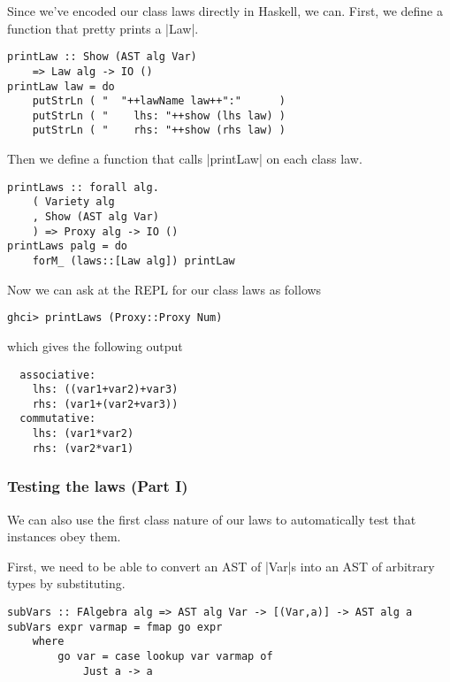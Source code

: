 \documentclass[preprint]{sigplanconf}
\theoremstyle{definition}
\begin{document}
Since we've encoded our class laws directly in Haskell, we can.
First, we define a function that pretty prints a |Law|.
\begin{lstlisting}
printLaw :: Show (AST alg Var)
    => Law alg -> IO ()
printLaw law = do
    putStrLn ( "  "++lawName law++":"      )
    putStrLn ( "    lhs: "++show (lhs law) )
    putStrLn ( "    rhs: "++show (rhs law) )
\end{lstlisting}
Then we define a function that calls |printLaw| on each class law.
\begin{lstlisting}
printLaws :: forall alg.
    ( Variety alg
    , Show (AST alg Var)
    ) => Proxy alg -> IO ()
printLaws palg = do
    forM_ (laws::[Law alg]) printLaw
\end{lstlisting}
Now we can ask at the REPL for our class laws as follows
\begin{lstlisting}
ghci> printLaws (Proxy::Proxy Num)
\end{lstlisting}
which gives the following output
\begin{lstlisting}
  associative:
    lhs: ((var1+var2)+var3)
    rhs: (var1+(var2+var3))
  commutative:
    lhs: (var1*var2)
    rhs: (var2*var1)
\end{lstlisting}

\subsubsection{Testing the laws (Part I)}
We can also use the first class nature of our laws to automatically test that instances obey them.

First, we need to be able to convert an AST of |Var|s into an AST of arbitrary types by substituting.
\begin{lstlisting}
subVars :: FAlgebra alg => AST alg Var -> [(Var,a)] -> AST alg a
subVars expr varmap = fmap go expr
    where
        go var = case lookup var varmap of
            Just a -> a
\end{lstlisting}
\end{document}
